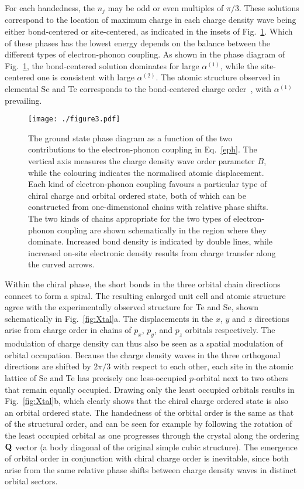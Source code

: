 \documentclass[aps,prl,twocolumn,superscriptaddress,groupedaddress]{revtex4}
\begin{document}
For each handedness, the $n_j$ may be odd or even multiples of ${\pi}/{3}$. These solutions correspond to the location of maximum charge in each charge density wave being either bond-centered or site-centered, as indicated in the insets of Fig.~\ref{fig:phasediagram}. Which of these phases has the lowest energy depends on the balance between the different types of electron-phonon coupling. As shown in the phase diagram of Fig.~\ref{fig:phasediagram}, the bond-centered solution dominates for large $\alpha^{(1)}$, while the site-centered one is consistent with large $\alpha^{(2)}$. The atomic structure observed in elemental Se and Te corresponds to the bond-centered charge order~\cite{tanaka}, with $\alpha^{(1)}$ prevailing. 
%
\begin{figure}
\begin{centering}
\texttt{[image: ./figure3.pdf]}
\end{centering}
\caption{\label{fig:phasediagram}The ground state phase diagram as a function of the two contributions to the electron-phonon coupling in Eq.~\eqref{eph}. The vertical axis measures the charge density wave order parameter $B$, while the colouring indicates the normalised atomic displacement. Each  kind of electron-phonon coupling favours a particular type of chiral charge and orbital ordered state, both of which can be constructed from one-dimensional chains with relative phase shifts. The two kinds of chains appropriate for the two types of electron-phonon coupling are shown schematically in the region where they dominate. Increased bond density is indicated by double lines, while increased on-site electronic density results from charge transfer along the curved arrows.}
\end{figure}

Within the chiral phase, the short bonds in the three orbital chain directions connect to form a spiral. The resulting enlarged unit cell and atomic structure agree with the experimentally observed structure for Te and Se, shown schematically in Fig.~\ref{fig:Xtal}a. The displacements in the $x$, $y$ and $z$ directions arise from charge order in chains of $p_x$, $p_y$, and $p_z$ orbitals respectively. The modulation of charge density can thus also be seen as a spatial modulation of orbital occupation. Because the charge density waves in the three orthogonal directions are shifted by $2{\pi}/{3}$ with respect to each other, each site in the atomic lattice of Se and Te has precisely one less-occupied $p$-orbital next to two others that remain equally occupied. Drawing only the least occupied orbitals results in Fig.~\ref{fig:Xtal}b, which clearly shows that the chiral charge ordered state is also an orbital ordered state. The handedness of the orbital order is the same as that of the structural order, and can be seen for example by following the rotation of the least occupied orbital as one progresses through the crystal along the ordering ${\bf Q}$ vector (a body diagonal of the original simple cubic structure). The emergence of orbital order in conjunction with chiral charge order is inevitable, since both arise from the same relative phase shifts between charge density waves in distinct orbital sectors.
\end{document}

